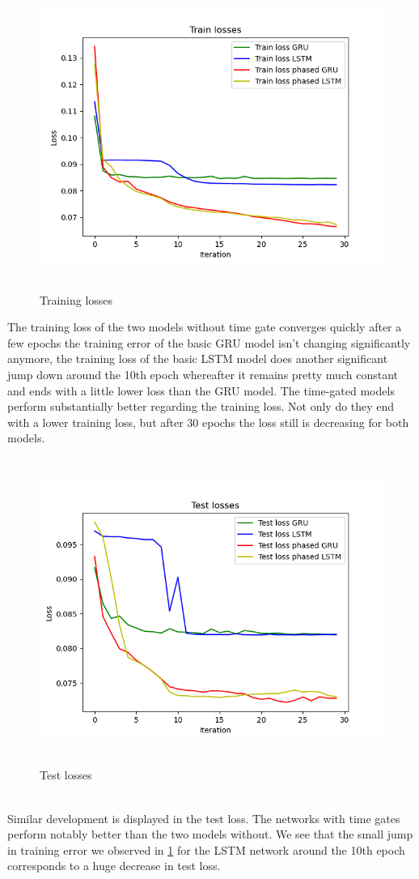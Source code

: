 \begin{figure}[h]
\centering
\includegraphics[height=10cm]{images/TrainingLosses_all.png}
\caption{Training losses}
\label{fig:trainloss}
\end{figure}
The training loss of the two models without time gate converges quickly after a few epochs the training error of the basic GRU model isn't changing significantly anymore, the training loss of the basic LSTM model does another significant jump down around the 10th epoch whereafter it remains pretty much constant and ends with a little lower loss than the GRU model. The time-gated models perform substantially better regarding the training loss. Not only do they end with a lower training loss, but after 30 epochs the loss still is decreasing for both models. \\
\begin{figure}[h] 
\centering
\includegraphics[height=10cm]{images/TestLosses_all.png}
\caption{Test losses}
\label{fig:testloss}
\end{figure}
\\
Similar development is displayed in the test loss. The networks with time gates perform notably better than the two models without. We see that the small jump in training error we observed in \ref{fig:trainloss} for the LSTM network around the 10th epoch corresponds to a huge decrease in test loss. 

